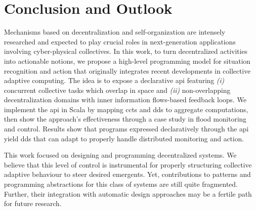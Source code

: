 \section{Conclusion and Outlook}\label{sec:conc}


Mechanisms based on decentralization and self-organization
 are intensely researched
 and expected to play crucial roles in 
 next-generation applications
 involving %
 cyber-physical collectives.
%
In this work,
 to turn decentralized activities into actionable notions,
 we propose a high-level programming model
 for situation recognition and action
 that originally integrates 
 recent developments
 in collective adaptive computing.
%
The idea is to expose a declarative \ac{api}
featuring
 \emph{(i)} concurrent collective tasks which overlap in space
 and
 \emph{(ii)} non-overlapping decentralization domains
 with inner information flows-based feedback loops.
%
We implement the \ac{api} in Scala
 by mapping \acp{cct} and \acp{dd}
 to \scafi{} aggregate computations,
 then show the approach's effectiveness
 through a case study in flood monitoring and control.
%
Results show that programs expressed declaratively through the \ac{api}
yield \acp{dd}
that can adapt to properly handle distributed monitoring and action.

This work focused on designing and programming 
 decentralized systems.
%
We believe that this level of control 
 is instrumental for properly structuring
 collective adaptive behaviour
 to steer desired emergents.
%
Yet, contributions to patterns and programming abstractions
 for this class of systems
 are still quite fragmented.
%
Further, their integration with automatic design approaches
 may be a fertile path for future research.

